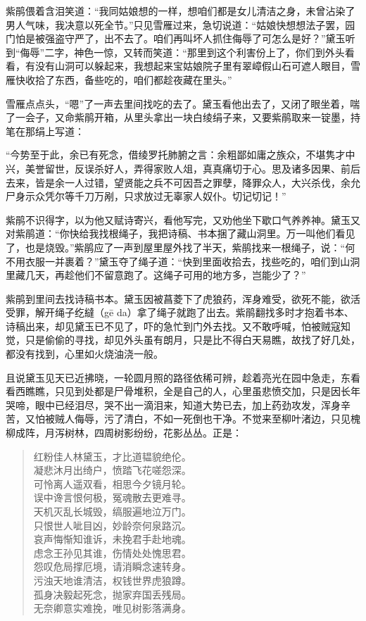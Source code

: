 \documentclass[12pt,oneside]{book}
\newenvironment{shici}{%
\begin{verse}%
\centering\large\hspace{12pt}}%
{\end{verse}}
\begin{document}
紫鹃偎着含泪笑道：“我同姑娘想的一样，想咱们都是女儿清洁之身，未曾沾染了男人气味，我决意以死全节。”只见雪雁过来，急切说道：“姑娘快想想法子罢，园门怕是被强盗守严了，出不去了。咱们再叫坏人抓住侮辱了可怎么是好？”黛玉听到“侮辱”二字，神色一惊，又转而笑道：“那里到这个利害份上了，你们到外头看看，有没有山洞可以躲起来，我想起来宝姑娘院子里有翠嶂假山石可遮人眼目，雪雁快收拾了东西，备些吃的，咱们都趁夜藏在里头。”

雪雁点点头，“嗯”了一声去里间找吃的去了。黛玉看他出去了，又闭了眼坐着，喘了一会子，又命紫鹃开箱，从里头拿出一块白绫绢子来，又要紫鹃取来一锭墨，持笔在那绢上写道：

“今势至于此，余已有死念，借绫罗托肺腑之言：余粗鄙如庸之族众，不堪隽才中兴，美誉留世，反误杀好人，弄得家败人俎，真真痛切于心。思及诸多因果、前后去来，皆是余一人过错，望贤能之兵不可因吾之罪孽，降罪众人，大兴杀伐，余允尸身示众凭尔等千刀万剐，只求放过无辜家人奴仆。切记切记！”

紫鹃不识得字，以为他又赋诗寄兴，看他写完，又劝他坐下歇口气养养神。黛玉又对紫鹃道：“你快给我找根绳子，我把诗稿、书本捆了藏山洞里。万一叫他们看见了，也是烧毁。”紫鹃应了一声到屋里屋外找了半天，紫鹃找来一根绳子，说：“何不用衣服一并裹着？”黛玉夺了绳子道：“快到里面收拾去，找些吃的，咱们到山洞里藏几天，再趁他们不留意跑了。这绳子可用的地方多，岂能少了？”

紫鹃到里间去找诗稿书本。黛玉因被菖菱下了虎狼药，浑身难受，欲死不能，欲活受罪，解开绳子纥繨（gē da）拿了绳子就跑了出去。紫鹃翻找多时才抱着书本、诗稿出来，却见黛玉已不见了，吓的急忙到门外去找。又不敢呼喊，怕被贼寇知觉，只是偷偷的寻找，却见外头虽有朗月，只是比不得白天易瞧，故找了好几处，都没有找到，心里如火烧油浇一般。

且说黛玉见天已近拂晓，一轮圆月照的路径依稀可辨，趁着亮光在园中急走，东看看西瞧瞧，只见到处都是尸骨堆积，全是自己的人，心里虽悲愤交加，只是因长年哭啼，眼中已经泪尽，哭不出一滴泪来，知道大势已去，加上药劲攻发，浑身辛苦，又怕被贼人侮辱，污了清白，不如一死倒也干净。不觉来至柳叶渚边，只见槐柳成阵，月泻树林，四周树影纷纷，花影丛丛。正是：

\begin{shici}
红粉佳人林黛玉，才比道韫貌绝伦。\\
凝悲沐月出绮户，愤踏飞花嗟怨深。\\
可怜离人遥双看，相思今夕镜月轮。\\
误中谗言恨何极，冤魂散去更难寻。\\
天机灭乱长城毁，缟服遍地泣万门。\\
只恨世人呲目凶，妙龄奈何泉路沉。\\
哀声悔惭知谁诉，未挽君手赴地魂。\\
虑念王孙见其谁，伤情处处愧思君。\\
怨叹危局撑厄境，请消瞬念速转身。\\
污浊天地谁清洁，权钱世界虎狼蹲。\\
孤身决毅起死念，抛家弃国丢残局。\\
无奈卿意实难挽，唯见树影落满身。
\end{shici}
\end{document}
